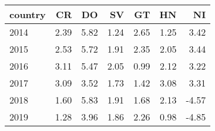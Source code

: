 \begin{tabular}{lrrrrrr}
\toprule
country &    CR &    DO &    SV &    GT &    HN &    NI \\
\midrule
2014 &  2.39 &  5.82 &  1.24 &  2.65 &  1.25 &  3.42 \\
2015 &  2.53 &  5.72 &  1.91 &  2.35 &  2.05 &  3.44 \\
2016 &  3.11 &  5.47 &  2.05 &  0.99 &  2.12 &  3.22 \\
2017 &  3.09 &  3.52 &  1.73 &  1.42 &  3.08 &  3.31 \\
2018 &  1.60 &  5.83 &  1.91 &  1.68 &  2.13 & -4.57 \\
2019 &  1.28 &  3.96 &  1.86 &  2.26 &  0.98 & -4.85 \\
\bottomrule
\end{tabular}
